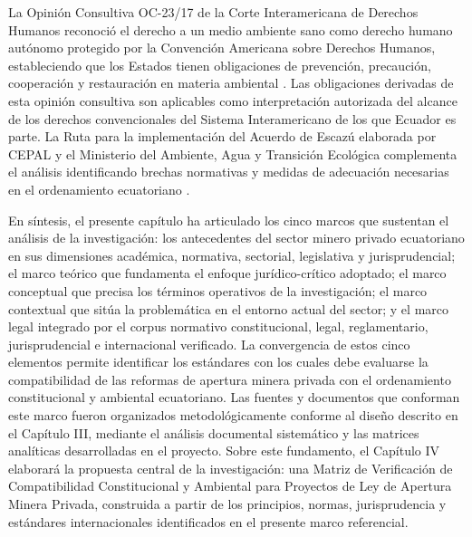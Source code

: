 La Opinión Consultiva OC-23/17 de la Corte Interamericana de Derechos Humanos reconoció el derecho a un medio ambiente sano como derecho humano autónomo protegido por la Convención Americana sobre Derechos Humanos, estableciendo que los Estados tienen obligaciones de prevención, precaución, cooperación y restauración en materia ambiental \parencite{corte_idh_oc23_2017}. Las obligaciones derivadas de esta opinión consultiva son aplicables como interpretación autorizada del alcance de los derechos convencionales del Sistema Interamericano de los que Ecuador es parte. La Ruta para la implementación del Acuerdo de Escazú elaborada por CEPAL y el Ministerio del Ambiente, Agua y Transición Ecológica complementa el análisis identificando brechas normativas y medidas de adecuación necesarias en el ordenamiento ecuatoriano \parencite{cepal_ruta_escazu_2023}.

En síntesis, el presente capítulo ha articulado los cinco marcos que sustentan el análisis de la investigación: los antecedentes del sector minero privado ecuatoriano en sus dimensiones académica, normativa, sectorial, legislativa y jurisprudencial; el marco teórico que fundamenta el enfoque jurídico-crítico adoptado; el marco conceptual que precisa los términos operativos de la investigación; el marco contextual que sitúa la problemática en el entorno actual del sector; y el marco legal integrado por el corpus normativo constitucional, legal, reglamentario, jurisprudencial e internacional verificado. La convergencia de estos cinco elementos permite identificar los estándares con los cuales debe evaluarse la compatibilidad de las reformas de apertura minera privada con el ordenamiento constitucional y ambiental ecuatoriano. Las fuentes y documentos que conforman este marco fueron organizados metodológicamente conforme al diseño descrito en el Capítulo III, mediante el análisis documental sistemático y las matrices analíticas desarrolladas en el proyecto. Sobre este fundamento, el Capítulo IV elaborará la propuesta central de la investigación: una Matriz de Verificación de Compatibilidad Constitucional y Ambiental para Proyectos de Ley de Apertura Minera Privada, construida a partir de los principios, normas, jurisprudencia y estándares internacionales identificados en el presente marco referencial.
